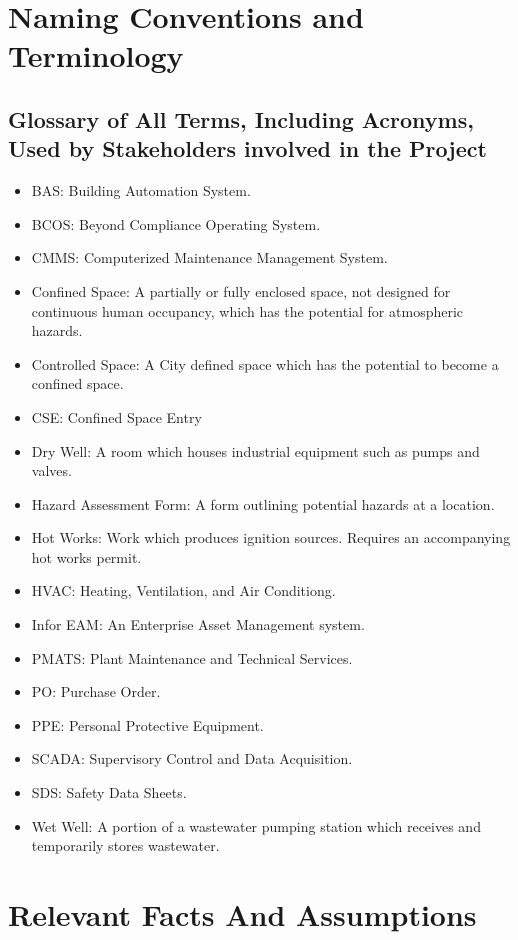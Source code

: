 \documentclass[12pt]{article}
\begin{document}
\section{Naming Conventions and Terminology}
\subsection{Glossary of All Terms, Including Acronyms, Used by Stakeholders
involved in the Project}
\begin{itemize}
    \item BAS: Building Automation System.
    \item BCOS: Beyond Compliance Operating System.
    \item CMMS: Computerized Maintenance Management System.
    \item Confined Space: A partially or fully enclosed space, not designed for 
    continuous human occupancy, which has the potential for 
    atmospheric hazards.
    \item Controlled Space: A City defined space which has the potential to
    become a confined space.
    \item CSE: Confined Space Entry
    \item Dry Well: A room which houses industrial equipment such as pumps 
    and valves.
    \item Hazard Assessment Form: A form outlining potential
    hazards at a location.
    \item Hot Works: Work which produces ignition sources.
    Requires an accompanying hot works permit.
    \item HVAC: Heating, Ventilation, and Air Conditiong.
    \item Infor EAM: An Enterprise Asset Management system.
    \item PMATS: Plant Maintenance and Technical Services.
    \item PO: Purchase Order.
    \item PPE: Personal Protective Equipment.
    \item SCADA: Supervisory Control and Data Acquisition.
    \item SDS: Safety Data Sheets.
    \item Wet Well: A portion of a wastewater pumping station which receives
    and temporarily stores wastewater.
\end{itemize}

\section{Relevant Facts And Assumptions}
\end{document}
